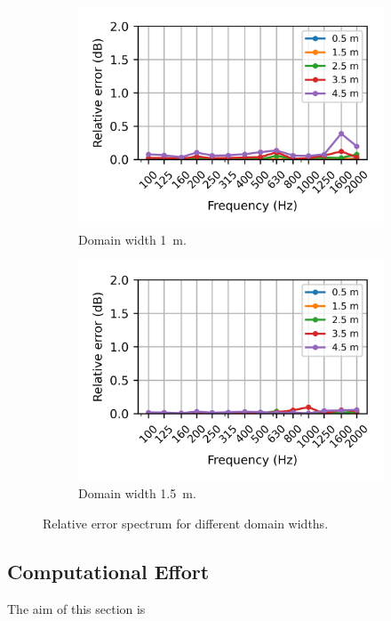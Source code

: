 \begin{figure}
	\begin{subfigure}[b]{0.48\textwidth}
		\centering
		\includegraphics{fig/chap4/simulation_domain/width_1m.png}
		\caption{Domain width \SI{1}{\meter}.}
	\end{subfigure}
	\hfill
	\begin{subfigure}[b]{0.48\textwidth}
		\centering
		\includegraphics{fig/chap4/simulation_domain/width_1pt5m.png}
		\caption{Domain width \SI{1.5}{\meter}.}
	\end{subfigure}
	\caption{Relative error spectrum for different domain widths.}
\end{figure}



\subsection*{Computational Effort}
The aim of this section is 

